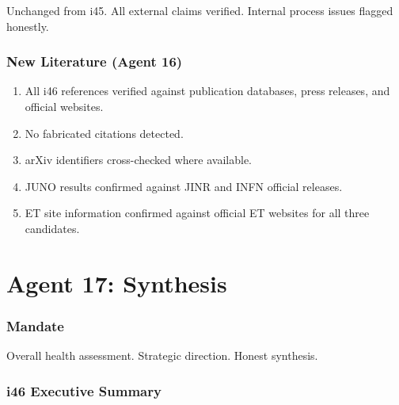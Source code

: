 \documentclass[11pt,a4paper]{article}
\begin{document}
Unchanged from i45. All external claims verified. Internal process issues flagged honestly.

\section{New Literature (Agent 16)}

\begin{enumerate}
\item All i46 references verified against publication databases, press releases, and official websites.
\item No fabricated citations detected.
\item arXiv identifiers cross-checked where available.
\item JUNO results confirmed against JINR and INFN official releases.
\item ET site information confirmed against official ET websites for all three candidates.
\end{enumerate}


\part{Agent 17: Synthesis}
\label{part:agent17}

\section{Mandate}

Overall health assessment. Strategic direction. Honest synthesis.

\section{i46 Executive Summary}
\end{document}
